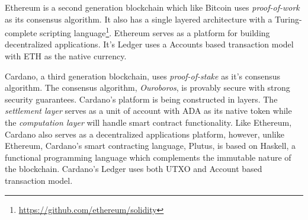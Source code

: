 		Ethereum\cite{buterin2014ethereum} is a second generation blockchain which like Bitcoin uses \textit{proof-of-work} as its consensus algorithm. It also has a single layered architecture with a Turing-complete scripting language\footnote{\url{https://github.com/ethereum/solidity}}. Ethereum serves as a platform for building decentralized applications. It's Ledger uses a Accounts based transaction model with ETH as the native currency.
		
		Cardano, a third generation blockchain, uses \textit{proof-of-stake} as it's consensus algorithm. The consensus algorithm, \textit{Ouroboros}\cite{kiayias2017ouroboros}, is provably secure with strong security guarantees. Cardano's platform is being constructed in layers. The \textit{settlement layer} serves as a unit of account with ADA as its native token while the \textit{computation layer} will handle smart contract functionality. Like Ethereum, Cardano also serves as a decentralized applications platform, however, unlike Ethereum, Cardano's smart contracting language, Plutus, is based on Haskell, a functional programming language which complements the immutable nature of the blockchain. Cardano's Ledger\cite{zahnentferner2018chimeric} uses both UTXO and Account based transaction model.